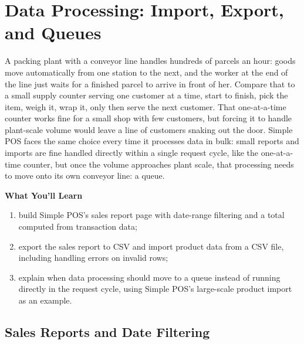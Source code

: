 
\chapter{Data Processing: Import, Export, and Queues}
\label{ch:pengolahan-data}


A packing plant with a conveyor line handles hundreds of parcels an
hour: goods move automatically from one station to the next, and the
worker at the end of the line just waits for a finished parcel to
arrive in front of her. Compare that to a small supply counter serving
one customer at a time, start to finish, pick the item, weigh it, wrap
it, only then serve the next customer. That one-at-a-time counter works
fine for a small shop with few customers, but forcing it to handle
plant-scale volume would leave a line of customers snaking out the
door. Simple POS faces the same choice every time it processes data in
bulk: small reports and imports are fine handled directly within a
single request cycle, like the one-at-a-time counter, but once the
volume approaches plant scale, that processing needs to move onto its
own conveyor line: a queue.

\textbf{What You'll Learn}

\begin{enumerate}
  \item build Simple POS's sales report page with date-range filtering and a total computed from transaction data;
  \item export the sales report to CSV and import product data from a CSV file, including handling errors on invalid rows;
  \item explain when data processing should move to a queue instead of running directly in the request cycle, using Simple POS's large-scale product import as an example.
\end{enumerate}

\section{Sales Reports and Date Filtering}
\label{sec:pengolahan-data-1}

